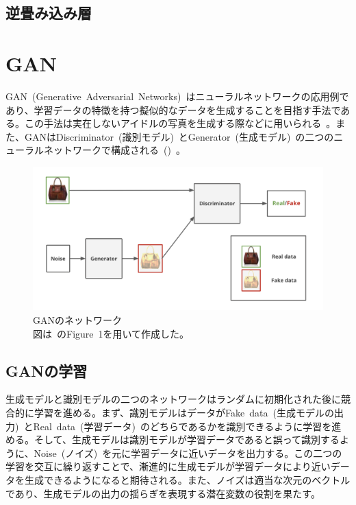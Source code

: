 \subsection{逆畳み込み層}

\clearpage

\section{GAN}

GAN~(Generative~Adversarial~Networks)~\cite{GAN}はニューラルネットワークの応用例であり、学習データの特徴を持つ擬似的なデータを生成することを目指す手法である。この手法は実在しないアイドルの写真を生成する際などに用いられる~\cite{idol}。また、GANはDiscriminator~(識別モデル)~とGenerator~(生成モデル)~の二つのニューラルネットワークで構成される~()~。

\begin{figure}[b]
\centering
\includegraphics[width=0.75\columnwidth]{figure/GAN_net.png}
\caption[GANのネットワーク]{GANのネットワーク\\
図は~\cite{pix2pix}のFigure~1を用いて作成した。}
\label{fig:GAN_net}
\end{figure}

\subsection{GANの学習}

生成モデルと識別モデルの二つのネットワークはランダムに初期化された後に競合的に学習を進める。まず、識別モデルはデータがFake~data~(生成モデルの出力)~とReal~data~(学習データ)~のどちらであるかを識別できるように学習を進める。そして、生成モデルは識別モデルが学習データであると誤って識別するように、Noise~(ノイズ)~を元に学習データに近いデータを出力する。この二つの学習を交互に繰り返すことで、漸進的に生成モデルが学習データにより近いデータを生成できるようになると期待される。また、ノイズは適当な次元のベクトルであり、生成モデルの出力の揺らぎを表現する潜在変数の役割を果たす。

